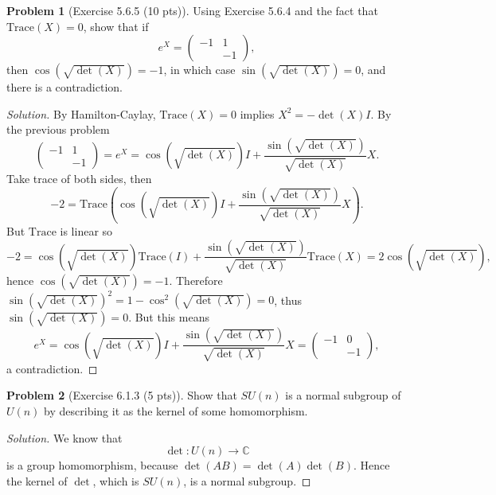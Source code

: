 \documentclass{article}
\theoremstyle{definition}
\newtheorem{problem}{Problem}
\theoremstyle{plain}
\begin{document}
\begin{problem}[Exercise 5.6.5 (10 pts)]
Using Exercise 5.6.4 and the fact that $\mathrm{Trace}(X)=0$, show that if
\begin{displaymath}
e^X=\begin{pmatrix}-1&1\\ &-1\end{pmatrix},
\end{displaymath}
then $\cos(\sqrt{\det(X)})=-1$, in which case $\sin(\sqrt{\det(X)})=0$, and there is a contradiction.
\end{problem}
\begin{adjustwidth}{0.7cm}{}
\color{blue}
\begin{proof}[Solution]
By Hamilton-Caylay, $\mathrm{Trace}(X)=0$ implies $X^2=-\det(X)I$. By the previous problem
\begin{displaymath}
\begin{pmatrix}-1&1\\ &-1\end{pmatrix}=e^X=\cos(\sqrt{\det(X)})I+\frac{\sin(\sqrt{\det(X)})}{\sqrt{\det(X)}}X.
\end{displaymath}
Take trace of both sides, then
\begin{displaymath}
-2=\mathrm{Trace}\left(\cos(\sqrt{\det(X)})I+\frac{\sin(\sqrt{\det(X)})}{\sqrt{\det(X)}}X\right).
\end{displaymath}
But $\mathrm{Trace}$ is linear so
\begin{displaymath}
-2=\cos(\sqrt{\det(X)})\mathrm{Trace}(I)+\frac{\sin(\sqrt{\det(X)})}{\sqrt{\det(X)}}\mathrm{Trace}(X)=2\cos(\sqrt{\det(X)}),
\end{displaymath}
hence $\cos(\sqrt{\det(X)})=-1$. Therefore $\sin(\sqrt{\det(X)})^2=1-\cos^2(\sqrt{\det(X)})=0$, thus $\sin(\sqrt{\det(X)})=0$. But this means
\begin{displaymath}
e^X=\cos(\sqrt{\det(X)})I+\frac{\sin(\sqrt{\det(X)})}{\sqrt{\det(X)}}X=\begin{pmatrix}-1&0\\ &-1\end{pmatrix},
\end{displaymath}
a contradiction.
\color{black}
\end{proof}
\end{adjustwidth}

\begin{problem}[Exercise 6.1.3 (5 pts)]
Show that $SU(n)$ is a normal subgroup of $U(n)$ by describing it as the kernel of some homomorphism.
\end{problem}
\begin{adjustwidth}{0.7cm}{}
\color{blue}
\begin{proof}[Solution]
We know that
\begin{displaymath}
\det:U(n)\to\mathbb{C}
\end{displaymath}
is a group homomorphism, because $\det(AB)=\det(A)\det(B)$. Hence the kernel of $\det$, which is $SU(n)$, is a normal subgroup.
\color{black}
\end{proof}
\end{adjustwidth}
\end{document}
